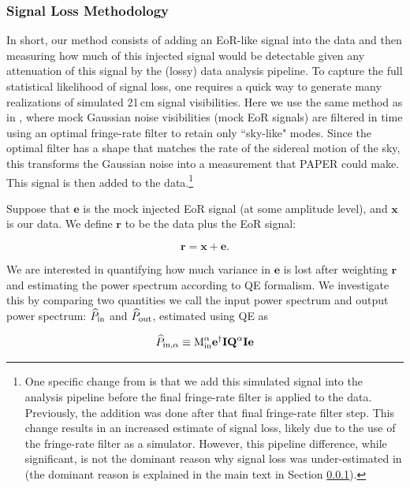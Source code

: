 \documentclass[preprint2,numberedappendix,tighten]{aastex6}
\begin{document}
\subsubsection{Signal Loss Methodology} 
\label{sec:siglossmethod}
In short, our method consists of adding an EoR-like signal into the data and then measuring how much of this injected signal would be detectable given any attenuation of this signal by the (lossy) data analysis pipeline.  To capture the full statistical likelihood of signal loss, one requires a quick way to generate many realizations of simulated 21\,cm signal visibilities. Here we use the same method as in , where mock Gaussian noise visibilities (mock EoR signals) 
are filtered in time using an optimal fringe-rate filter to retain only ``sky-like" modes. Since the optimal filter has a shape that matches the rate of the sidereal motion of the sky, this transforms the Gaussian noise into a measurement that PAPER could make. This signal is then added to the data.\footnote{One 
specific change from  is that we add this simulated signal into the analysis pipeline before the final fringe-rate filter is 
applied to the data. Previously, the addition was done after that final fringe-rate filter step.  This change results in an increased 
estimate of signal loss, %
likely due to the use of the fringe-rate filter as a simulator. However, this pipeline difference, while significant, is not the dominant reason why signal loss was under-estimated in  (the dominant reason is explained in the main text in Section \ref{sec:siglossmethod}).}

Suppose that $\textbf{e}$ is the mock injected EoR signal (at some amplitude level), and $\textbf{x}$ is our data. We define $\textbf{r}
$ to be the data plus the EoR signal:

\begin{equation}
\label{eq:rxe}
\textbf{r} = \textbf{x} + \textbf{e}.
\end{equation}

We are interested in quantifying how much variance in $\textbf{e}$ is lost after weighting $\textbf{r}$ and estimating the power 
spectrum according to QE formalism. We investigate this by comparing two quantities we call the input power spectrum and 
output power spectrum: $\widehat{P}_{\rm in}$ and $\widehat{P}_{\rm out}$, estimated using QE as

\begin{equation}
\label{eq:Pin}
\widehat{P}_{\rm in,\alpha} \equiv \text{M}^{\alpha}_{\rm in}\textbf{e}^{\dagger}\textbf{I}\textbf{Q}^{\alpha}\textbf{I}\textbf{e}
\end{equation}
\end{document}
